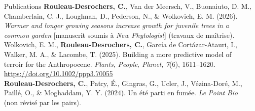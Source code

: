 \documentclass[
	11pt, %
]{resume} %
\begin{document}
\begin{rSection}{Publications}
\textbf{Rouleau-Desrochers, C.}, Van der Meersch, V., Buonaiuto, D. M., Chamberlain, C. J., Loughnan, D., Pederson, N., \& Wolkovich, E. M. (2026). \textit{Warmer and longer growing seasons increase growth for juvenile trees in a common garden} [manuscrit soumis à \textit{New Phytologist}] (travaux de maîtrise). 
\vspace{1.5ex}\\
Wolkovich, E. M., \textbf{Rouleau-Desrochers, C.}, García de Cortázar-Atauri, I., Walker, M. A., \& Lacombe, T. (2025). Building a more predictive model of terroir for the Anthropocene. \textit{Plants, People, Planet}, \textit{7}(6), 1611--1620. \href{https://doi.org/10.1002/ppp3.70055}{https://doi.org/10.1002/ppp3.70055}
\vspace{1.5ex}\\
\textbf{Rouleau-Desrochers, C.}, Patry, É., Gingras, G., Ucler, J., Vézina-Doré, M., Paillé, O., \& Moghaddam, Y. Y. (2024). Un été parti en fumée. \textit{Le Point Bio} (non révisé par les pairs).
\end{rSection}

\end{document}
